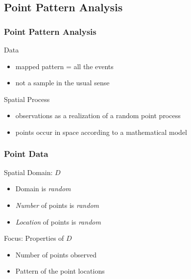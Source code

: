 \documentclass[nototal,handout]{beamer}
\begin{document}
  \subsection{Point Pattern Analysis}
  \begin{frame}
    \frametitle{Point Pattern Analysis}
    \begin{block}{Data}
      \begin{itemize}
	\item mapped pattern = all the events
	\item not a sample in the usual sense
      \end{itemize}
     \end{block}
    \begin{block}{Spatial Process}
      \begin{itemize}
	\item observations as a realization of a random point process
	\item points occur in space according to a mathematical model 
      \end{itemize}
     \end{block}
   \end{frame}
   \begin{frame}
     \frametitle{Point Data}
     \begin{block}{Spatial Domain: $D$}
       \begin{itemize}
	 \item Domain is \emph{random}
	 \item \emph{Number} of points is \emph{random}
	 \item \emph{Location} of points is \emph{random}
       \end{itemize}
      \end{block}
      \begin{block}{Focus: Properties of $D$}
	\begin{itemize}
	  \item Number of points observed
	  \item Pattern of the point locations
	\end{itemize}
      \end{block}
    \end{frame}
\end{document}
